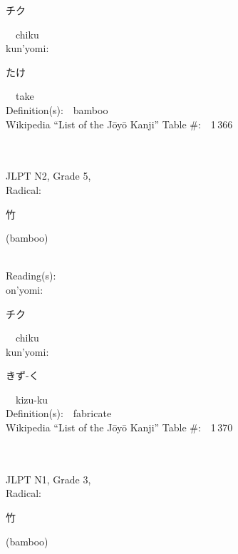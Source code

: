 \begin{multicols}{2}
{\hspace*{2em}}{\begin{CJK}{UTF8}{min} チク \end{CJK}}\ \ chiku\ \ \\
{\hspace*{1em}}kun'yomi:\ \ \\
{\hspace*{2em}}{\begin{CJK}{UTF8}{min} たけ \end{CJK}}\ \ take\ \ \\
Definition(s):\ \ bamboo \\
Wikipedia ``List of the J\=oy\=o Kanji'' Table \#:\ \ 1\,366 \\
\ \ \\
{\fontsize{34pt}{40pt}  }\ \ \\  %
{JLPT N2, Grade 5, \\Radical:\ \ {\begin{CJK}{UTF8}{min} 竹 \end{CJK}} (bamboo) } \\
Reading(s):\ \ \\
{\hspace*{1em}}on'yomi:\ \ \\
{\hspace*{2em}}{\begin{CJK}{UTF8}{min} チク \end{CJK}}\ \ chiku\ \ \\
{\hspace*{1em}}kun'yomi:\ \ \\
{\hspace*{2em}}{\begin{CJK}{UTF8}{min} きず-く \end{CJK}}\ \ kizu-ku\ \ \\
Definition(s):\ \ fabricate \\
Wikipedia ``List of the J\=oy\=o Kanji'' Table \#:\ \ 1\,370 \\
\ \ \\
{\fontsize{34pt}{40pt}  }\ \ \\  %
{JLPT N1, Grade 3, \\Radical:\ \ {\begin{CJK}{UTF8}{min} 竹 \end{CJK}} (bamboo) } \\

\end{multicols}
